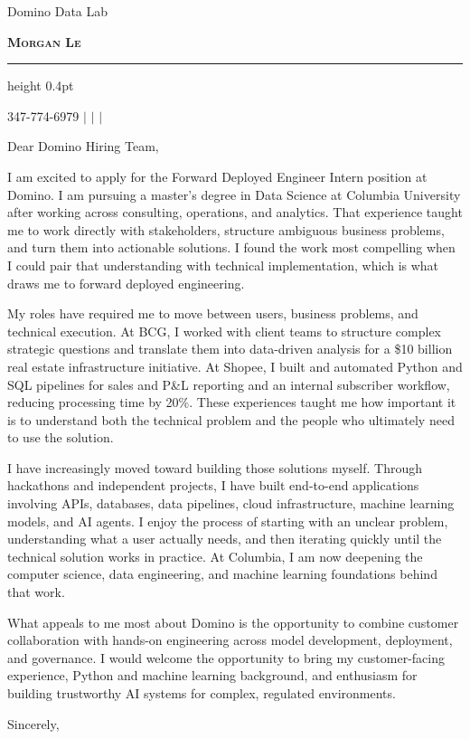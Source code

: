 \documentclass[a4paper,11pt]{letter}
\begin{document}
\signature{Morgan Le}
\longindentation=0pt
\let\raggedleft\raggedright

\begin{letter}{Domino Data Lab}

\begin{center}
    \textbf{\Huge \scshape Morgan Le}\par
    \vspace{5pt}
    \hrule height 0.4pt
    \vspace{0pt}
    {\small 347-774-6979 $|$
    \href{mailto:ml5536@columbia.edu}{\underline{}} $|$
    \href{https://www.linkedin.com/in/morganhle/}{\underline{}} $|$
    \href{https://lhnminh.github.io/}{\underline{}}\par}
\end{center}
\vspace*{1.2in}

\opening{Dear Domino Hiring Team,}

\noindent I am excited to apply for the Forward Deployed Engineer Intern position at Domino. I am pursuing a master's degree in Data Science at Columbia University after working across consulting, operations, and analytics. That experience taught me to work directly with stakeholders, structure ambiguous business problems, and turn them into actionable solutions. I found the work most compelling when I could pair that understanding with technical implementation, which is what draws me to forward deployed engineering.

\noindent My roles have required me to move between users, business problems, and technical execution. At BCG, I worked with client teams to structure complex strategic questions and translate them into data-driven analysis for a \$10 billion real estate infrastructure initiative. At Shopee, I built and automated Python and SQL pipelines for sales and P\&L reporting and an internal subscriber workflow, reducing processing time by 20\%. These experiences taught me how important it is to understand both the technical problem and the people who ultimately need to use the solution.

\noindent I have increasingly moved toward building those solutions myself. Through hackathons and independent projects, I have built end-to-end applications involving APIs, databases, data pipelines, cloud infrastructure, machine learning models, and AI agents. I enjoy the process of starting with an unclear problem, understanding what a user actually needs, and then iterating quickly until the technical solution works in practice. At Columbia, I am now deepening the computer science, data engineering, and machine learning foundations behind that work.

\noindent What appeals to me most about Domino is the opportunity to combine customer collaboration with hands-on engineering across model development, deployment, and governance. I would welcome the opportunity to bring my customer-facing experience, Python and machine learning background, and enthusiasm for building trustworthy AI systems for complex, regulated environments.

\closing{Sincerely,}

\end{letter}
\end{document}
